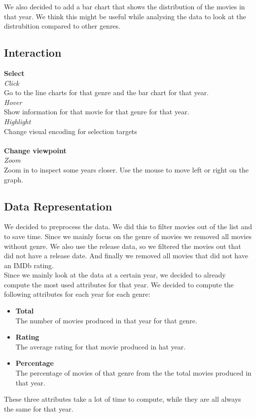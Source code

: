 	We also decided to add a bar chart that shows the distribution of the movies in that year. 
	We think this might be useful while analysing the data to look at the distrubition compared to other genres. 
	
	\subsection{Interaction}
	\textbf{Select}\\
	\emph{Click}\\
	Go to the line charts for that genre and the bar chart for that year. \\
	\emph{Hover}\\
	Show information for that movie for that genre for that year. \\
	\emph{Highlight}\\
	Change visual encoding for selection targets\\ \\
	\textbf{Change viewpoint }\\
	\emph{Zoom}\\
	Zoom in to inspect some years closer. 
	Use the mouse to move left or right on the graph. \\

	\subsection{Data Representation}
	We decided to preprocess the data. We did this to filter movies out of the list and to save time.
	Since we mainly focus on the genre of movies we removed all movies without genre.
	We also use the release data, so we filtered the movies out that did not have a release date.
	And finally we removed all movies that did not have an IMDb rating. \\
	Since we mainly look at the data at a certain year, we decided to already compute the most used attributes for that year.
	We decided to compute the following attributes for each year for each genre:
	\begin{itemize}
	\item \textbf{Total}\\
	The number of movies produced in that year for that genre.
	\item \textbf{Rating} \\
	The average rating for that movie produced in hat year.
	\item \textbf{Percentage} \\
	The percentage of movies of that genre from the the total movies produced in that year.
	\end{itemize}
	These three attributes take a lot of time to compute, while they are all always the same for that year. 

	
